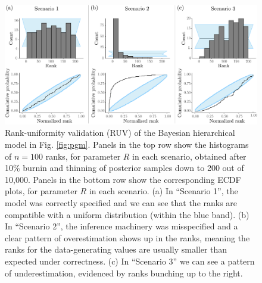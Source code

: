 \documentclass[oneside]{article}
\begin{document}
\begin{figure}
  \centering
  \includegraphics[width=0.95\linewidth]{../figures/sbc_Yule_BM_r_manual.pdf}
  \caption{
    Rank-uniformity validation (RUV) of the Bayesian hierarchical model in Fig. \ref{fig:pgm}.
    Panels in the top row show the histograms of $n=100$ ranks, for parameter $R$ in each scenario, obtained after 10\% burnin and thinning of posterior samples down to 200 out of 10,000.
    Panels in the bottom row show the corresponding ECDF plots, for parameter $R$ in each scenario.
    (a) In ``Scenario 1'', the model was correctly specified and we can see that the ranks are compatible with a uniform distribution (within the blue band). 
    (b) In ``Scenario 2'', the inference machinery was misspecified and a clear pattern of overestimation shows up in the ranks, meaning the ranks for the data-generating values are usually smaller than expected under correctness.
    (c) In ``Scenario 3'' we can see a pattern of underestimation, evidenced by ranks bunching up to the right.
  }
  \label{fig:ruv_yule}
\end{figure}
\end{document}
